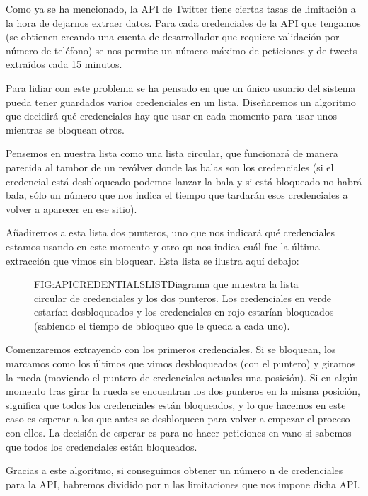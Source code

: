 Como ya se ha mencionado, la API de Twitter tiene ciertas tasas de limitación a la hora de dejarnos extraer datos. Para cada credenciales de la API que tengamos (se obtienen creando una cuenta de desarrollador que requiere validación por número de teléfono) se nos permite un número máximo de peticiones y de tweets extraídos cada 15 minutos.

Para lidiar con este problema se ha pensado en que un único usuario del sistema pueda tener guardados varios credenciales en un lista. Diseñaremos un algoritmo que decidirá qué credenciales hay que usar en cada momento para usar unos mientras se bloquean otros.

Pensemos en nuestra lista como una lista circular, que funcionará de manera parecida al tambor de un revólver donde las balas son los credenciales (si el credencial está desbloqueado podemos lanzar la bala y si está bloqueado no habrá bala, sólo un número que nos indica el tiempo que tardarán esos credenciales a volver a aparecer en ese sitio). 

Añadiremos a esta lista dos punteros, uno que nos indicará qué credenciales estamos usando en este momento y otro qu nos indica cuál fue la última extracción que vimos sin bloquear. Esta lista se ilustra aquí debajo:

 \begin{figure}[Lista circular de credenciales]{FIG:APICREDENTIALSLIST}{Diagrama que muestra la lista circular de credenciales y los dos punteros. Los credenciales en verde estarían desbloqueados y los credenciales en rojo estarían bloqueados (sabiendo el tiempo de bbloqueo que le queda a cada uno)}.
\end{figure}

Comenzaremos extrayendo con los primeros credenciales. Si se bloquean, los marcamos como los últimos que vimos desbloqueados (con el puntero) y giramos la rueda (moviendo el puntero de credenciales actuales una posición). Si en algún momento tras girar la rueda se encuentran los dos punteros en la misma posición, significa que todos los credenciales están bloqueados, y lo que hacemos en este caso es esperar a los que antes se desbloqueen para volver a empezar el proceso con ellos. La decisión de esperar es para no hacer peticiones en vano si sabemos que todos los credenciales están bloqueados.

Gracias a este algoritmo, si conseguimos obtener un número n de credenciales para la API, habremos dividido por n las limitaciones que nos impone dicha API. 

